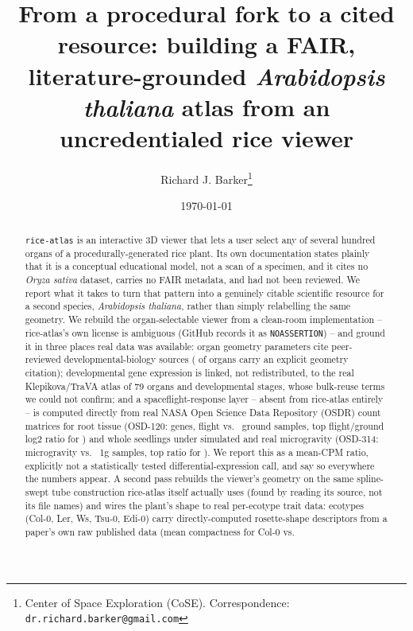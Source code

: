 \documentclass[11pt,a4paper]{article}
\title{From a procedural fork to a cited resource: building a FAIR,
literature-grounded \textit{Arabidopsis thaliana} atlas from an uncredentialed
rice viewer}
\author{Richard J. Barker\thanks{Center of Space Exploration (CoSE).
Correspondence: \texttt{dr.richard.barker@gmail.com}}}
\date{\today}
\begin{document}
\maketitle

\begin{abstract}
\texttt{rice-atlas} is an interactive 3D viewer that lets a user select any of several
hundred organs of a procedurally-generated rice plant. Its own documentation states
plainly that it is a conceptual educational model, not a scan of a specimen, and it cites
no \textit{Oryza sativa} dataset, carries no FAIR metadata, and had not been reviewed. We
report what it takes to turn that pattern into a genuinely citable scientific resource for
a second species, \textit{Arabidopsis thaliana}, rather than simply relabelling the same
geometry. We rebuild the organ-selectable viewer from a clean-room implementation --
rice-atlas's own license is ambiguous (GitHub records it as \texttt{NOASSERTION}) -- and
ground it in three places real data was available: organ geometry parameters cite
peer-reviewed developmental-biology sources (\NumOrgansWithGeometryCitation{} of
\NumOrgansModeled{} organs carry an explicit geometry citation); developmental gene
expression is linked, not redistributed, to the real Klepikova/TraVA atlas of 79 organs and
developmental stages, whose
bulk-reuse terms we could not confirm; and a spaceflight-response layer -- absent from
rice-atlas entirely -- is computed directly from real NASA Open Science Data Repository
(OSDR) count matrices for root tissue (OSD-120: \NumGenesOsdOneTwentyZero{} genes,
\NumFlightSamplesOsdOneTwentyZero{} flight vs.\ \NumGroundSamplesOsdOneTwentyZero{} ground
samples, top flight/ground log2 ratio \TopFoldChangeOsdOneTwentyZero{} for
\texttt{\TopGeneOsdOneTwentyZero{}}) and whole seedlings under simulated and real
microgravity (OSD-314: \NumMicrogSamplesOsdThreeFourteen{} microgravity vs.\
\NumGroundSamplesOsdThreeFourteen{} 1g samples, top ratio \TopFoldChangeOsdThreeFourteen{} for
\texttt{\TopGeneOsdThreeFourteen{}}). We report this as a mean-CPM ratio, explicitly not a
statistically tested differential-expression call, and say so everywhere the numbers
appear. A second pass rebuilds the viewer's geometry on the same spline-swept tube
construction rice-atlas itself actually uses (found by reading its source, not its file
names) and wires the plant's shape to real per-ecotype trait data: \NumMagicFounderEcotypesUsed{}
ecotypes (Col-0, Ler, Ws, Tsu-0, Edi-0) carry directly-computed rosette-shape descriptors
from a paper's own raw published data (mean compactness \ColZeroCompactness{} for Col-0 vs.\

\end{abstract}
\end{document}
